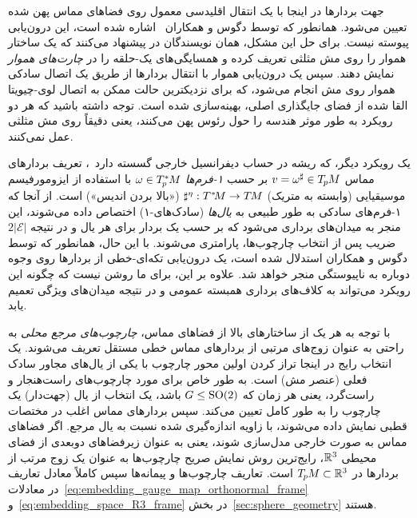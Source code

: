 جهت بردارها در اینجا با یک انتقال اقلیدسی معمول روی فضاهای مماس پهن شده تعیین می‌شود.
همانطور که توسط دگوس و همکاران~\cite{deGoes2016VectorFieldProcessing} اشاره شده است، این درون‌یابی پیوسته نیست.
برای حل این مشکل، همان نویسندگان در \cite{liu2016discreteConnection} پیشنهاد می‌کنند که یک ساختار هموار را روی مش مثلثی تعریف کرده و همسایگی‌های یک-حلقه را در \emph{چارت‌های هموار} نمایش دهند.
سپس یک درون‌یابی هموار با انتقال بردارها از طریق یک اتصال سادکی هموار روی مش انجام می‌شود، که برای نزدیکترین حالت ممکن به اتصال لوی-چیویتا القا شده از فضای جایگذاری اصلی، بهینه‌سازی شده است.
توجه داشته باشید که هر دو رویکرد به طور موثر هندسه را حول رئوس پهن می‌کنند، یعنی دقیقاً روی مش مثلثی عمل نمی‌کنند.


یک رویکرد دیگر، که ریشه در حساب دیفرانسیل خارجی گسسته دارد~\cite{desbrun2005DiscreteExteriorCalculus,elcott2005building}، تعریف بردارهای مماس $v = \omega^\sharp \in T_{\mkern-1.5mu p}\mkern-.5muM$ بر حسب \emph{۱-فرم‌ها} $\omega \in T_{\mkern-1.5mu p}^{\mkern-0mu *}\mkern-1muM$ با استفاده از ایزومورفیسم موسیقیایی (وابسته به متریک) $\sharp^\eta: T^{\mkern0.5mu *}\mkern-3.5muM \to T\mkern-1.5muM$ («بالا بردن اندیس») است.
از آنجا که ۱-فرم‌های سادکی به طور طبیعی به \emph{یال‌ها} (سادک‌های-۱) اختصاص داده می‌شوند، این منجر به میدان‌های برداری می‌شود که بر حسب یک بردار برای هر یال و در نتیجه $2|\mathcal{E}|$ ضریب پس از انتخاب چارچوب‌ها، پارامتری می‌شوند.
با این حال، همانطور که توسط دگوس و همکاران\cite{deGoes2016VectorFieldProcessing} استدلال شده است، یک درون‌یابی تکه‌ای-خطی از بردارها روی وجوه دوباره به ناپیوستگی منجر خواهد شد.
علاوه بر این، برای ما روشن نیست که چگونه این رویکرد می‌تواند به کلاف‌های برداری همبسته عمومی و در نتیجه میدان‌های ویژگی تعمیم یابد.







با توجه به هر یک از ساختارهای بالا از فضاهای مماس، \emph{چارچوب‌های مرجع محلی} به راحتی به عنوان زوج‌های مرتبی از بردارهای مماس خطی مستقل تعریف می‌شوند.
یک انتخاب رایج در اینجا تراز کردن اولین محور چارچوب با یکی از یال‌های مجاور سادک فعلی (عنصر مش) است.
به طور خاص برای مورد چارچوب‌های راست‌هنجار و راست‌گرد، یعنی هر زمان که $G\leq\operatorname{SO}(2)$ باشد، یک انتخاب از یال (جهت‌دار) یک چارچوب را به طور کامل تعیین می‌کند.
سپس بردارهای مماس اغلب در مختصات قطبی نمایش داده می‌شوند، با زاویه اندازه‌گیری شده نسبت به یال مرجع.
اگر فضاهای مماس به صورت خارجی مدل‌سازی شوند، یعنی به عنوان زیرفضاهای دوبعدی از فضای محیطی $\mathbb{R}^3$، رایج‌ترین روش نمایش صریح چارچوب‌ها به عنوان یک زوج مرتب از بردارها در $T_{\mkern-1.5mu p}\mkern-.5muM \subset \mathbb{R}^3$ است.
تعاریف چارچوب‌ها و پیمانه‌ها سپس کاملاً معادل تعاریف در
معادلات~\eqref{eq:embedding_gauge_map_orthonormal_frame} و~\eqref{eq:embedding_space_R3_frame}
در بخش~\ref{sec:sphere_geometry} هستند.

